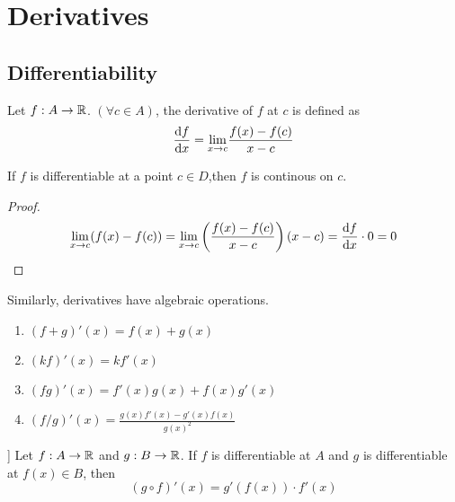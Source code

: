 \chapter{Derivatives}
\section{Differentiability}
\begin{definition} Let $f : A \to {\mathbb{R}}$. $(\forall c \in A)$, the derivative of $f$ at $c$ is defined as
    \[\dv{f}{x}= \underset{x \to c}{\lim} \frac{f(x) - f(c)}{x-c}\]
\end{definition}
\begin{theorem}
    If $f$ is differentiable at a point $c \in D$,then $f$ is continous on $c$.
    \begin{proof}
        \[\underset{x \to c}{\lim} (f(x) - f(c) )= \underset{x \to c}{\lim}\left( \frac{f(x)-f(c)}{x-c} \right) (x-c) = \dv{f}{x} \cdot 0 = 0\]
    \end{proof}
\end{theorem}

\begin{theorem} Similarly, derivatives have algebraic operations.
    \begin{enumerate}
        \item $(f+g)'(x) = f(x) + g(x)$
        \item $(kf)'(x) = k f'(x)$
        \item $(fg)'(x) = f'(x)g(x) + f(x)g'(x) $
        \item $(f/g)'(x)= \frac{g(x)f'(x) - g'(x)f(x)}{g(x)^2}$
    \end{enumerate}
\end{theorem}

\begin{theorem}] Let $f: A \to {\mathbb{R}}$ and $g: B \to {\mathbb{R}}$. If $f$ is differentiable at $A$ and $g$ is differentiable at $f(x) \in B$, then
    \[ (g \circ f)'(x)= g'(f(x)) \cdot f'(x)\]
\end{theorem}

